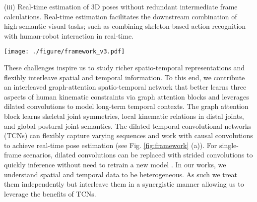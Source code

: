 \documentclass[letterpaper, 10 pt, conference, twoside]{ieeeconf}
\begin{document}
(iii) Real-time estimation of 3D poses without redundant intermediate frame calculations. Real-time estimation facilitates the downstream combination of high-semantic visual tasks; such as combining skeleton-based action recognition with human-robot interaction in real-time.

\begin{figure*}[thbp]
	\centering
	\texttt{[image: ./figure/framework\_v3.pdf]}
	\caption{Schematic overview of the GAST-Net framework. The input consists of consecutive 2D pose estimates from RGB images. The output is a sequence of reconstructed 3D poses from the corresponding 2D keypoints. GAST-Net synergistically interleaves 3 components: (a) a dilated temporal convolutional model (with 2D keypoint sequences as input (bottom) and 3D pose estimates as output (top)) with (b) a set of local attention mechanisms for visualized joints (\emph{i.e.} the right-wrist) including local kinematic dependencies and symmetric relations, and (c) a global attention mechanism that informs about posture semantics.}
	\label{fig:framework}
\end{figure*}
These challenges inspire us to study richer spatio-temporal representations and flexibly interleave spatial and temporal information. To this end, we contribute an interleaved graph-attention spatio-temporal network that better learns three aspects of human kinematic constraints via graph attention blocks and leverages dilated convolutions to model long-term temporal contexts. The graph attention block learns skeletal joint symmetries, local kinematic relations in distal joints, and global postural joint semantics. The dilated temporal convolutional networks (TCNs) can flexibly capture varying sequences and work with causal convolutions to achieve real-time pose estimation\cite{pavllo20193d,bai2018an} (see Fig. \ref{fig:framework} (a)). For single-frame scenarios, dilated convolutions can be replaced with strided convolutions to quickly inference without need to retrain a new model \cite{pavllo20193d}. In our works, we understand spatial and temporal data to be heterogeneous. As such we treat them independently but interleave them in a synergistic manner allowing us to leverage the benefits of TCNs.
\end{document}
